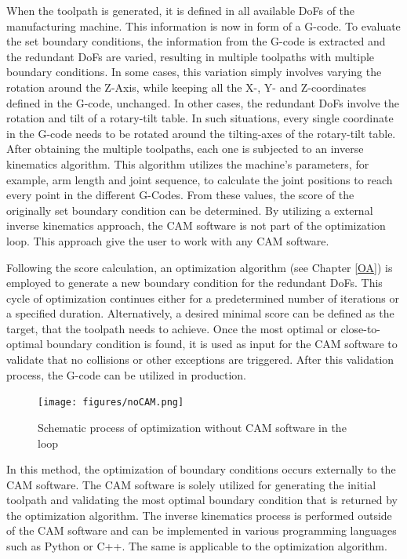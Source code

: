 When the toolpath is generated, it is defined in all available \acrshort{DoF}s of the manufacturing machine. This information is now in form of a G-code. To evaluate the set boundary conditions, the information from the G-code is extracted and the redundant \acrshort{DoF}s are varied, resulting in multiple toolpaths with multiple boundary conditions. In some cases, this variation simply involves varying the rotation around the Z-Axis, while keeping all the X-, Y- and Z-coordinates defined in the G-code, unchanged. In other cases, the redundant \acrshort{DoF}s involve the rotation and tilt of a rotary-tilt table. In such situations, every single coordinate in the G-code needs to be rotated around the tilting-axes of the rotary-tilt table. After obtaining the multiple toolpaths, each one is subjected to an inverse kinematics algorithm. This algorithm utilizes the machine's parameters, for example, arm length and joint sequence, to calculate the joint positions to reach every point in the different G-Codes. From these values, the score of the originally set boundary condition can be determined. By utilizing a external inverse kinematics approach, the \acrshort{CAM} software is not part of the optimization loop. This approach give  the user to work with any \acrshort{CAM} software.  

Following the score calculation, an optimization algorithm (see Chapter \ref{OA}) is employed to generate a new boundary condition for the redundant \acrshort{DoF}s. This cycle of optimization continues either for a predetermined number of iterations or a specified duration. 
\newpage
Alternatively, a desired minimal score can be defined as the target, that the toolpath needs to achieve. Once the most optimal or close-to-optimal boundary condition is found, it is used as input for the \acrshort{CAM} software to validate that no collisions or other exceptions are triggered. After this validation process, the G-code can be utilized in production.

\begin{figure}[H]
	\centerline{\texttt{[image: figures/noCAM.png]}}
	\caption{Schematic process of optimization without CAM software in the loop}
	\label{noCAM}
\end{figure}

In this method, the optimization of boundary conditions occurs externally to the \acrshort{CAM} software. The \acrshort{CAM} software is solely utilized for generating the initial toolpath and validating the most optimal boundary condition that is returned by the optimization algorithm. The inverse kinematics process is performed outside of the \acrshort{CAM} software and can be implemented in various programming languages such as Python or C++. The same is applicable to the optimization algorithm.


